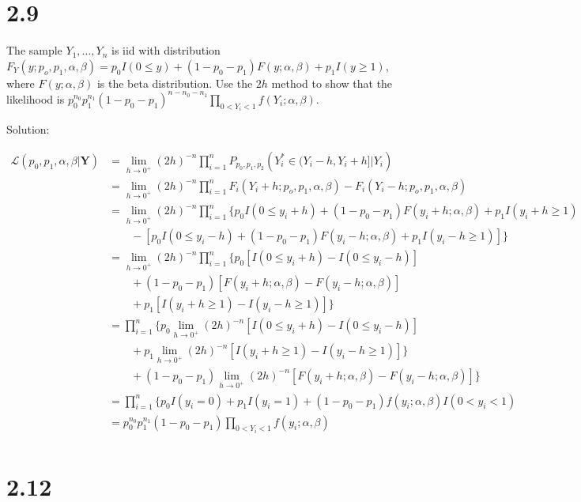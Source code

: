 \documentclass[
  letterpaper,
  DIV=11,
  numbers=noendperiod]{scrreprt}
\begin{document}
\newpage

\hypertarget{section-3}{%
\section{2.9}\label{section-3}}

The sample \(Y_1,\dots, Y_n\) is iid with distribution
\(F_Y(y;p_o,p_1,\alpha, \beta)= p_0I(0 \leq y) + (1-p_0-p_1)F(y;\alpha,\beta) + p_1I(y\geq 1)\),
where \(F(y;\alpha,\beta)\) is the beta distribution. Use the \(2h\)
method to show that the likelihood is
\(p_0^{n_0}p_1^{n_1}(1-p_0-p_1)^{n-n_0-n_1} \prod_{0<Y_i<1} f(Y_i;\alpha,\beta)\).

Solution:

\[
\begin{aligned}
\mathcal L(p_0,p_1,\alpha, \beta | \mathbf{Y}) &= \lim_{h \to 0^+} (2h)^{-n} \prod_{i=1}^n P_{p_0,p_1,p_2}\left(Y_i^* \in (Y_i-h,Y_i+h] |Y_i \right) \\
&= \lim_{h \to 0^+} (2h)^{-n} \prod_{i=1}^n F_i(Y_i+h;p_o,p_1,\alpha, \beta)-F_i(Y_i-h;p_o,p_1,\alpha, \beta) \\
&= \lim_{h \to 0^+} (2h)^{-n} \prod_{i=1}^n \big\{ p_0I(0 \leq y_i+h) + (1-p_0-p_1)F(y_i+h;\alpha,\beta) + p_1I(y_i+h\geq 1) \\
&~~~~~~~~~-[p_0I(0 \leq y_i-h) + (1-p_0-p_1)F(y_i-h;\alpha,\beta) + p_1I(y_i-h\geq 1)] \big\} \\
&= \lim_{h \to 0^+} (2h)^{-n} \prod_{i=1}^n \big\{ p_0[I(0 \leq y_i+h)-I(0 \leq y_i-h)] \\
&~~~~~~~~~+ (1-p_0-p_1)[F(y_i+h;\alpha,\beta)-F(y_i-h;\alpha,\beta)] \\
&~~~~~~~~~+ p_1[I(y_i+h\geq 1)-I(y_i-h\geq 1)] \big\} \\
&=\prod_{i=1}^n \big\{ p_0\lim_{h \to 0^+} (2h)^{-n}[I(0 \leq y_i+h)-I(0 \leq y_i-h)]\\
&~~~~~~~~~+ p_1\lim_{h \to 0^+} (2h)^{-n}[I(y_i+h\geq 1)-I(y_i-h\geq 1)] \big\} \\
&~~~~~~~~~+ (1-p_0-p_1)\lim_{h \to 0^+} (2h)^{-n}[F(y_i+h;\alpha,\beta)-F(y_i-h;\alpha,\beta)]\big\}  \\
&=\prod_{i=1}^n \big\{ p_0 I(y_i=0) + p_1I(y_i=1) + (1-p_0-p_1)f(y_i;\alpha,\beta)I(0<y_i<1) \\
&=p_0^{n_0}p_1^{n_1}(1-p_0-p_1)\prod_{0<Y_i<1} f(y_i;\alpha,\beta) \\
\end{aligned}
\]

\newpage

\hypertarget{section-4}{%
\section{2.12}\label{section-4}}
\end{document}
